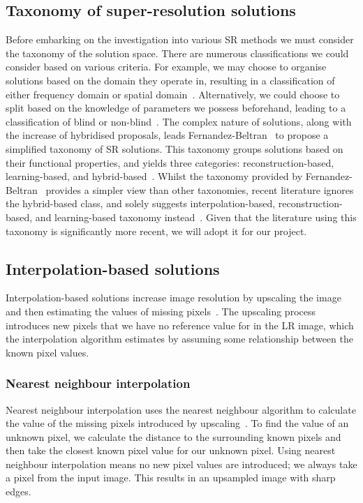 \subsection{Taxonomy of super-resolution solutions}
Before embarking on the investigation into various SR methods we must consider the taxonomy of the solution space. There are numerous classifications we could consider based on various criteria. For example, we may choose to organise solutions based on the domain they operate in, resulting in a classification of either frequency domain or spatial domain~\cite{superResRemoteSensingOverview}. Alternatively, we could choose to split based on the knowledge of parameters we possess beforehand, leading to a classification of blind or non-blind~\cite{superResRemoteSensingOverview}. The complex nature of solutions, along with the increase of hybridised proposals, leads Fernandez-Beltran \etal\ to propose a simplified taxonomy of SR solutions. This taxonomy groups solutions based on their functional properties, and yields three categories: reconstruction-based, learning-based, and hybrid-based~\cite{superResRemoteSensingOverview}. Whilst the taxonomy provided by Fernandez-Beltran \etal\ provides a simpler view than other taxonomies, recent literature ignores the hybrid-based class, and solely suggests interpolation-based, reconstruction-based, and learning-based taxonomy instead~\cite{remoteSensingDeepLearningReview, remoteSensingGANsReview, isrgan, tesagan}. Given that the literature using this taxonomy is significantly more recent, we will adopt it for our project.

\subsection{Interpolation-based solutions}
Interpolation-based solutions increase image resolution by upscaling the image and then estimating the values of missing pixels~\cite{interpolation}. The upscaling process introduces new pixels that we have no reference value for in the LR image, which the interpolation algorithm estimates by assuming some relationship between the known pixel values. 

\subsubsection{Nearest neighbour interpolation}
Nearest neighbour interpolation uses the nearest neighbour algorithm to calculate the value of the missing pixels introduced by upscaling~\cite{nnInterpolation}. To find the value of an unknown pixel, we calculate the distance to the surrounding known pixels and then take the closest known pixel value for our unknown pixel. Using nearest neighbour interpolation means no new pixel values are introduced; we always take a pixel from the input image. This results in an upsampled image with sharp edges.

